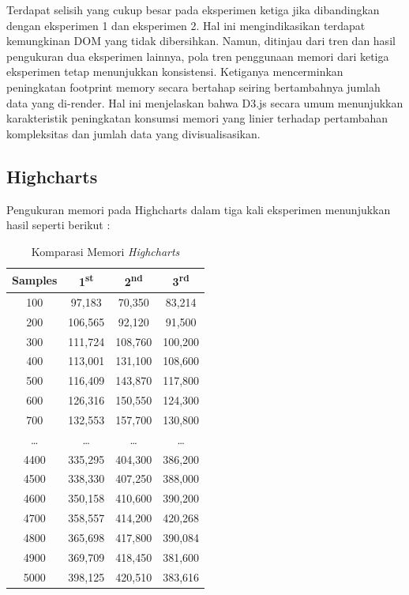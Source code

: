 Terdapat selisih yang cukup besar pada eksperimen ketiga jika dibandingkan dengan eksperimen 1 dan eksperimen 2. Hal ini mengindikasikan terdapat kemungkinan DOM yang tidak dibersihkan. Namun, ditinjau dari tren dan hasil pengukuran dua eksperimen lainnya, pola tren penggunaan memori dari ketiga eksperimen tetap menunjukkan konsistensi. Ketiganya mencerminkan peningkatan footprint memory secara bertahap seiring bertambahnya jumlah data yang di-render. Hal ini menjelaskan bahwa D3.js secara umum menunjukkan karakteristik peningkatan konsumsi memori yang linier terhadap pertambahan kompleksitas dan jumlah data yang divisualisasikan.

\subsection{Highcharts}
Pengukuran memori pada Highcharts dalam tiga kali eksperimen menunjukkan hasil  seperti berikut :
\begin{table}[H]
	\centering
	\caption{Komparasi Memori \textit{Highcharts}}
	\begin{tabular}{|c|c|c|c|}
		\hline
		\textbf{Samples} & \textbf{1\textsuperscript{st}} & \textbf{2\textsuperscript{nd}} & \textbf{3\textsuperscript{rd}} \\
		\hline
		100  & 97,183   & 70,350   & 83,214   \\
		200  & 106,565  & 92,120   & 91,500   \\
		300  & 111,724  & 108,760  & 100,200  \\
		400  & 113,001  & 131,100  & 108,600  \\
		500  & 116,409  & 143,870  & 117,800  \\
		600  & 126,316  & 150,550  & 124,300  \\
		700  & 132,553  & 157,700  & 130,800  \\
		\ldots & \ldots & \ldots & \ldots \\
		4400 & 335,295  & 404,300  & 386,200  \\
		4500 & 338,330  & 407,250  & 388,000  \\
		4600 & 350,158  & 410,600  & 390,200  \\
		4700 & 358,557  & 414,200  & 420,268  \\
		4800 & 365,698  & 417,800  & 390,084  \\
		4900 & 369,709  & 418,450  & 381,600  \\
		5000 & 398,125  & 420,510  & 383,616  \\
		\hline
	\end{tabular}
\end{table}

